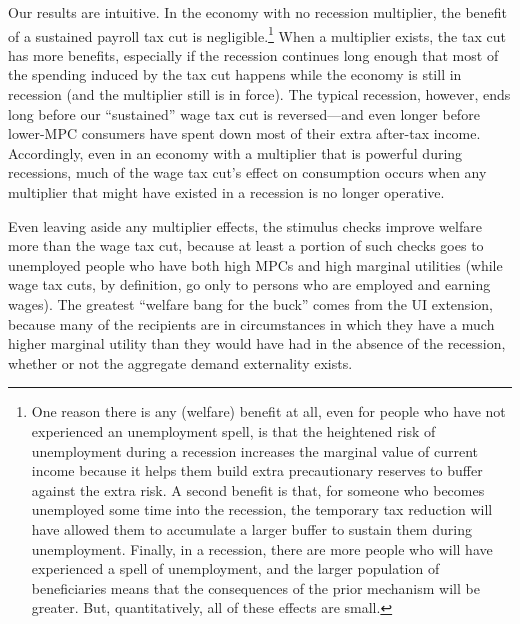 \documentclass[qe,draft]{econsocart}
\theoremstyle{plain}
\theoremstyle{definition}
\begin{document}
Our results are intuitive.  In the economy with no recession multiplier, the benefit of a sustained payroll tax cut is negligible.\footnote{One reason there is any (welfare) benefit at all, even for people who have not experienced an unemployment spell, is that the heightened risk of unemployment during a recession increases the marginal value of current income because it helps them build extra precautionary reserves to buffer against the extra risk.  A second benefit is that, for someone who becomes unemployed some time into the recession, the temporary tax reduction will have allowed them to accumulate a larger buffer to sustain them during unemployment.  Finally, in a recession, there are more people who will have experienced a spell of unemployment, and the larger population of beneficiaries means that the consequences of the prior mechanism will be greater.  But, quantitatively, all of these effects are small.}
When a multiplier exists, the tax cut has more benefits, especially if the recession continues long enough that most of the spending induced by the tax cut happens while the economy is still in recession (and the multiplier still is in force).  The typical recession, however, ends long before our ``sustained'' wage tax cut is reversed---and even longer before lower-MPC consumers have spent down most of their extra after-tax income. Accordingly, even in an economy with a multiplier that is powerful during recessions, much of the wage tax cut's effect on consumption occurs when any multiplier that might have existed in a recession is no longer operative.

Even leaving aside any multiplier effects, the stimulus checks improve welfare more than the wage tax cut, because at least a portion of such checks goes to unemployed people who have both high MPCs and high marginal utilities (while wage tax cuts, by definition, go only to persons who are employed and earning wages). The greatest ``welfare bang for the buck'' comes from the UI extension, because many of the recipients are in circumstances in which they have a much higher marginal utility than they would have had in the absence of the recession, whether or not the aggregate demand externality exists.
\end{document}
